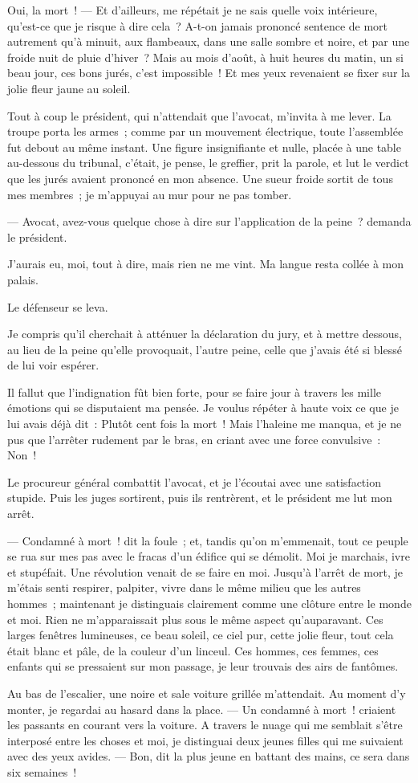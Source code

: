 \documentclass[french,twoside]{book} %
\begin{document}
Oui, la mort ! — Et d’ailleurs, me répétait je ne sais quelle voix intérieure, qu’est-ce que je risque à dire cela ? A-t-on jamais prononcé sentence de mort autrement qu’à minuit, aux flambeaux, dans une salle  sombre et noire, et par une froide nuit de pluie d’hiver ? Mais au mois d’août, à huit heures du matin, un si beau jour, ces bons jurés, c’est impossible ! Et mes yeux revenaient se fixer sur la jolie fleur jaune au soleil.\par
Tout à coup le président, qui n’attendait que l’avocat, m’invita à me lever. La troupe porta les armes ; comme par un mouvement électrique, toute l’assemblée fut debout au même instant. Une figure insignifiante et nulle, placée à une table au-dessous du tribunal, c’était, je pense, le greffier, prit la parole, et lut le verdict que les jurés avaient prononcé en mon absence. Une sueur froide sortit de tous mes membres ; je m’appuyai au mur pour ne pas tomber.\par
— Avocat, avez-vous quelque chose à dire sur l’application de la peine ? demanda le président.\par
J’aurais eu, moi, tout à dire, mais rien ne me vint. Ma langue resta collée à mon palais.\par
Le défenseur se leva.\par
Je compris qu’il cherchait à atténuer la déclaration du jury, et à mettre dessous, au lieu de la peine qu’elle provoquait, l’autre peine, celle que j’avais été si blessé de lui voir espérer.\par
Il fallut que l’indignation fût bien forte, pour se faire jour à travers les mille émotions qui se disputaient ma pensée. Je voulus répéter à haute voix ce que je lui avais déjà dit : Plutôt cent fois la mort ! Mais l’haleine me manqua, et je ne pus que l’arrêter rudement par le bras, en criant avec une force convulsive : Non !\par
 Le procureur général combattit l’avocat, et je l’écoutai avec une satisfaction stupide. Puis les juges sortirent, puis ils rentrèrent, et le président me lut mon arrêt.\par
— Condamné à mort ! dit la foule ; et, tandis qu’on m’emmenait, tout ce peuple se rua sur mes pas avec le fracas d’un édifice qui se démolit. Moi je marchais, ivre et stupéfait. Une révolution venait de se faire en moi. Jusqu’à l’arrêt de mort, je m’étais senti respirer, palpiter, vivre dans le même milieu que les autres hommes ; maintenant je distinguais clairement comme une clôture entre le monde et moi. Rien ne m’apparaissait plus sous le même aspect qu’auparavant. Ces larges fenêtres lumineuses, ce beau soleil, ce ciel pur, cette jolie fleur, tout cela était blanc et pâle, de la couleur d’un linceul. Ces hommes, ces femmes, ces enfants qui se pressaient sur mon passage, je leur trouvais des airs de fantômes.\par
Au bas de l’escalier, une noire et sale voiture grillée m’attendait. Au moment d’y monter, je regardai au hasard dans la place. — Un condamné à mort ! criaient les passants en courant vers la voiture. A travers le nuage qui me semblait s’être interposé entre les choses et moi, je distinguai deux jeunes filles qui me suivaient avec des yeux avides. — Bon, dit la plus jeune en battant des mains, ce sera dans six semaines !
\end{document}
